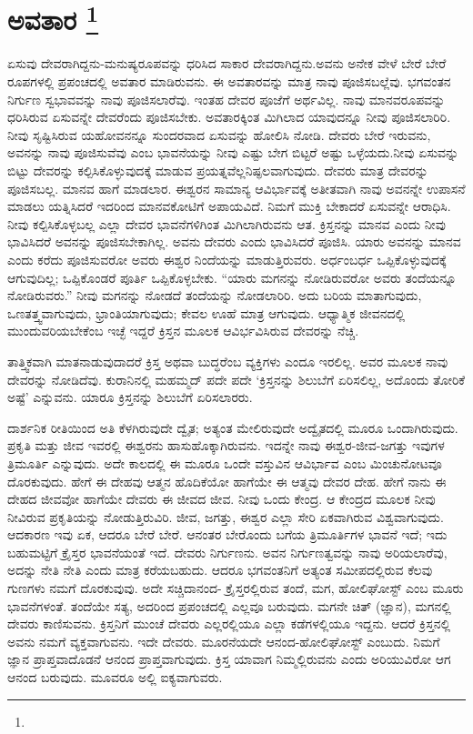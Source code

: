 
\vspace{-0.5cm}

\chapter[ಅವತಾರ ]{ಅವತಾರ \protect\footnote{}}

ಏಸುವು ದೇವರಾಗಿದ್ದನು-ಮನುಷ್ಯರೂಪವನ್ನು ಧರಿಸಿದ ಸಾಕಾರ ದೇವರಾಗಿದ್ದನು.\break ಅವನು ಅನೇಕ ವೇಳೆ ಬೇರೆ ಬೇರೆ ರೂಪಗಳಲ್ಲಿ ಪ್ರಪಂಚದಲ್ಲಿ ಅವತಾರ ಮಾಡಿರುವನು. ಈ ಅವತಾರವನ್ನು ಮಾತ್ರ ನಾವು ಪೂಜಿಸಬಲ್ಲೆವು. ಭಗವಂತನ ನಿರ್ಗುಣ ಸ್ವಭಾವವನ್ನು ನಾವು ಪೂಜಿಸಲಾರೆವು. ಇಂತಹ ದೇವರ ಪೂಜೆಗೆ ಅರ್ಥವಿಲ್ಲ. ನಾವು ಮಾನವರೂಪವನ್ನು ಧರಿಸಿರುವ ಏಸುವನ್ನೇ ದೇವರೆಂದು ಪೂಜಿಸಬೇಕು. ಅವತಾರಕ್ಕಿಂತ ಮಿಗಿಲಾದ ಯಾವುದನ್ನೂ ನೀವು ಪೂಜಿಸಲಾರಿರಿ. ನೀವು ಸೃಷ್ಟಿಸಿರುವ ಯಹೋವನನ್ನೂ ಸುಂದರವಾದ ಏಸುವನ್ನು ಹೋಲಿಸಿ ನೋಡಿ. ದೇವರು ಬೇರೆ ಇರುವನು, ಅವನನ್ನು ನಾವು ಪೂಜಿಸುವೆವು ಎಂಬ ಭಾವನೆಯನ್ನು ನೀವು ಎಷ್ಟು ಬೇಗ ಬಿಟ್ಟರೆ ಅಷ್ಟು ಒಳ್ಳೆಯದು.\break ನೀವು ಏಸುವನ್ನು ಬಿಟ್ಟು ದೇವರನ್ನು ಕಲ್ಪಿಸಿಕೊಳ್ಳುವುದಕ್ಕೆ ಮಾಡುವ ಪ್ರಯತ್ನವೆಲ್ಲ\break ನಿಷ್ಫಲವಾಗುವುದು. ದೇವರು ಮಾತ್ರ ದೇವರನ್ನು ಪೂಜಿಸಬಲ್ಲ. ಮಾನವ ಹಾಗೆ ಮಾಡಲಾರ. ಈಶ್ವರನ ಸಾಮಾನ್ಯ ಆವಿರ್ಭಾವಕ್ಕೆ ಅತೀತವಾಗಿ ನಾವು ಅವನನ್ನೇ ಉಪಾಸನೆ ಮಾಡಲು ಯತ್ನಿಸಿದರೆ ಇದರಿಂದ ಮಾನವಕೋಟಿಗೆ ಅಪಾಯವಿದೆ. ನಿಮಗೆ ಮುಕ್ತಿ ಬೇಕಾದರೆ ಏಸುವನ್ನೇ ಆರಾಧಿಸಿ. ನೀವು ಕಲ್ಪಿಸಿಕೊಳ್ಳಬಲ್ಲ ಎಲ್ಲಾ ದೇವರ ಭಾವನೆಗಳಿಗಿಂತ ಮಿಗಿಲಾಗಿರುವನು ಆತ. ಕ್ರಿಸ್ತನನ್ನು ಮಾನವ ಎಂದು ನೀವು ಭಾವಿಸಿದರೆ ಅವನನ್ನು ಪೂಜಿಸಬೇಕಾಗಿಲ್ಲ. ಅವನು ದೇವರು ಎಂದು ಭಾವಿಸಿದರೆ ಪೂಜಿಸಿ. ಯಾರು ಅವನನ್ನು ಮಾನವ ಎಂದು ಕರೆದು ಪೂಜಿಸುವರೋ ಅವರು ಈಶ್ವರ ನಿಂದೆಯನ್ನು ಮಾಡುತ್ತಿರುವರು. ಅರ್ಧಂಬರ್ಧ ಒಪ್ಪಿಕೊಳ್ಳುವುದಕ್ಕೆ ಆಗುವುದಿಲ್ಲ; ಒಪ್ಪಿಕೊಂಡರೆ ಪೂರ್ತಿ ಒಪ್ಪಿಕೊಳ್ಳಬೇಕು. “ಯಾರು ಮಗನನ್ನು ನೋಡಿರುವರೋ ಅವರು ತಂದೆಯನ್ನೂ ನೋಡಿರುವರು.” ನೀವು ಮಗನನ್ನು ನೋಡದೆ ತಂದೆಯನ್ನು ನೋಡಲಾರಿರಿ. ಅದು ಬರಿಯ ಮಾತಾಗುವುದು, ಒಣತತ್ತ್ವವಾಗುವುದು, ಭ್ರಾಂತಿಯಾಗುವುದು; ಕೇವಲ ಊಹೆ ಮಾತ್ರ ಆಗುವುದು. ಆಧ್ಯಾತ್ಮಿಕ ಜೀವನದಲ್ಲಿ ಮುಂದುವರಿಯಬೇಕೆಂಬ ಇಚ್ಛೆ ಇದ್ದರೆ ಕ್ರಿಸ್ತನ ಮೂಲಕ ಆವಿರ್ಭವಿಸಿರುವ ದೇವರನ್ನು ನೆಚ್ಚಿ.

ತಾತ್ತ್ವಿಕವಾಗಿ ಮಾತನಾಡುವುದಾದರೆ ಕ್ರಿಸ್ತ ಅಥವಾ ಬುದ್ಧರೆಂಬ ವ್ಯಕ್ತಿಗಳು ಎಂದೂ ಇರಲಿಲ್ಲ. ಅವರ ಮೂಲಕ ನಾವು ದೇವರನ್ನು ನೋಡಿದೆವು. ಕುರಾನಿನಲ್ಲಿ ಮಹಮ್ಮದ್​ ಪದೇ ಪದೇ ‘ಕ್ರಿಸ್ತನನ್ನು ಶಿಲುಬೆಗೆ ಏರಿಸಲಿಲ್ಲ, ಅದೊಂದು ತೋರಿಕೆ ಅಷ್ಟೆ’ ಎನ್ನುವನು. ಯಾರೂ ಕ್ರಿಸ್ತನನ್ನು ಶಿಲುಬೆಗೆ ಏರಿಸಲಾರರು.

ದಾರ್ಶನಿಕ ರೀತಿಯಿಂದ ಅತಿ ಕೆಳಗಿರುವುದೇ ದ್ವೈತ; ಅತ್ಯಂತ ಮೇಲಿರುವುದೇ ಅದ್ವೈತದಲ್ಲಿ ಮೂರೂ ಒಂದಾಗಿರುವುದು. ಪ್ರಕೃತಿ ಮತ್ತು ಜೀವ ಇವರಲ್ಲಿ ಈಶ್ವರನು ಹಾಸುಹೊಕ್ಕಾಗಿರುವನು. ಇದನ್ನೇ ನಾವು ಈಶ್ವರ-ಜೀವ-ಜಗತ್ತು ಇವುಗಳ ತ್ರಿಮೂರ್ತಿ ಎನ್ನುವುದು. ಅದೇ ಕಾಲದಲ್ಲಿ ಈ ಮೂರೂ ಒಂದೇ ವಸ್ತುವಿನ ಆವಿರ್ಭಾವ ಎಂಬ ಮಿಂಚುನೋಟವೂ ದೊರಕುವುದು. ಹೇಗೆ ಈ ದೇಹವು ಆತ್ಮನ ಹೊದಿಕೆಯೋ ಹಾಗೆಯೇ ಈ ಆತ್ಮವು ದೇವರ ದೇಹ. ಹೇಗೆ ನಾನು ಈ ದೇಹದ ಜೀವವೋ ಹಾಗೆಯೇ ದೇವರು ಈ ಜೀವದ ಜೀವ. ನೀವು ಒಂದು ಕೇಂದ್ರ. ಆ ಕೇಂದ್ರದ ಮೂಲಕ ನೀವು ನೀವಿರುವ ಪ್ರಕೃತಿಯನ್ನು ನೋಡುತ್ತಿರುವಿರಿ. ಜೀವ, ಜಗತ್ತು, ಈಶ್ವರ ಎಲ್ಲಾ ಸೇರಿ ಏಕವಾಗಿರುವ ವಿಶ್ವವಾಗುವುದು. ಆದಕಾರಣ ಇವು ಏಕ, ಆದರೂ ಬೇರೆ ಬೇರೆ. ಆನಂತರ ಬೇರೊಂದು ಬಗೆಯ ತ್ರಿಮೂರ್ತಿಗಳ ಭಾವನೆ ಇದೆ; ಇದು ಬಹುಮಟ್ಟಿಗೆ ಕ್ರೈಸ್ತರ ಭಾವನೆಯಂತೆ ಇದೆ. ದೇವರು ನಿರ್ಗುಣನು. ಅವನ ನಿರ್ಗುಣತ್ವವನ್ನು ನಾವು ಅರಿಯಲಾರೆವು, ಅದನ್ನು ನೇತಿ ನೇತಿ ಎಂದು ಮಾತ್ರ ಕರೆಯಬಹುದು. ಆದರೂ ಭಗವಂತನಿಗೆ ಅತ್ಯಂತ ಸಮೀಪದಲ್ಲಿರುವ ಕೆಲವು ಗುಣಗಳು ನಮಗೆ ದೊರಕುವುವು. ಅದೇ ಸಚ್ಚಿದಾನಂದ- ಕ್ರೈಸ್ತರಲ್ಲಿರುವ ತಂದೆ, ಮಗ, ಹೋಲಿಘೋಸ್ಟ್​ ಎಂಬ ಮೂರು ಭಾವನೆಗಳಂತೆ. ತಂದೆಯೇ ಸತ್ಯ, ಅದರಿಂದ ಪ್ರಪಂಚದಲ್ಲಿ ಎಲ್ಲವೂ ಬರುವುದು. ಮಗನೇ ಚಿತ್​ (ಜ್ಞಾನ), ಮಗನಲ್ಲಿ ದೇವರು ಕಾಣಿಸುವನು. ಕ್ರಿಸ್ತನಿಗೆ ಮುಂಚೆ ದೇವರು ಎಲ್ಲರಲ್ಲಿಯೂ ಎಲ್ಲಾ ಕಡೆಗಳಲ್ಲಿಯೂ ಇದ್ದನು. ಆದರೆ ಕ್ರಿಸ್ತನಲ್ಲಿ ಅವನು ನಮಗೆ ವ್ಯಕ್ತವಾಗುವನು. ಇದೇ ದೇವರು. ಮೂರನೆಯದೇ ಆನಂದ-ಹೋಲಿಘೋಸ್ಟ್​ ಎಂಬುದು. ನಿಮಗೆ ಜ್ಞಾನ ಪ್ರಾಪ್ತವಾದೊಡನೆ ಆನಂದ ಪ್ರಾಪ್ತವಾಗುವುದು. ಕ್ರಿಸ್ತ ಯಾವಾಗ ನಿಮ್ಮಲ್ಲಿರುವನು ಎಂದು ಅರಿಯುವಿರೋ ಆಗ ಆನಂದ ಬರುವುದು. ಮೂವರೂ ಅಲ್ಲಿ ಐಕ್ಯವಾಗುವರು.

